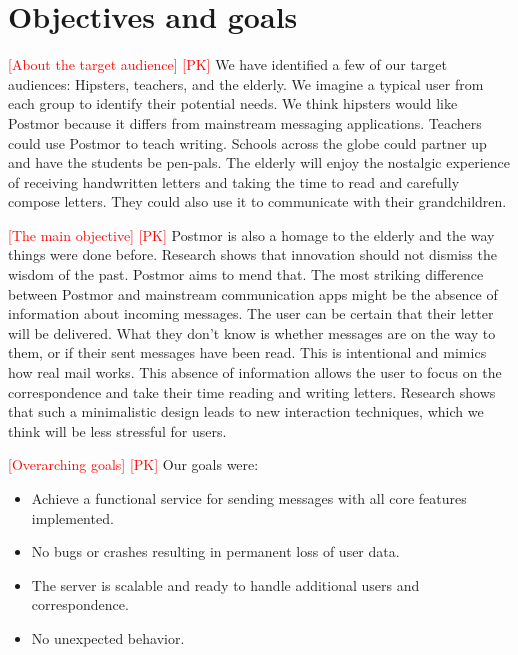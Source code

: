 \documentclass[acmlarge, review=false, screen=true]{acmart}
\begin{document}
  \section{Objectives and goals}
    \textcolor{red}{[About the target audience] [PK]} \newline
    We have identified a few of our target audiences: Hipsters, teachers, and the elderly. We imagine a typical user from each group to identify their potential needs. We think hipsters would like Postmor because it differs from mainstream messaging applications. Teachers could use Postmor to teach writing. Schools across the globe could partner up and have the students be pen-pals. The elderly will enjoy the nostalgic experience of receiving handwritten letters and taking the time to read and carefully compose letters. They could also use it to communicate with their grandchildren. 

    \textcolor{red}{[The main objective] [PK]} \newline
    Postmor is also a homage to the elderly and the way things were done before. Research shows that innovation should not dismiss the wisdom of the past\cite{design-inspiration}. Postmor aims to mend that. The most striking difference between Postmor and mainstream communication apps might be the absence of information about incoming messages. The user can be certain that their letter will be delivered. What they don’t know is whether messages are on the way to them, or if their sent messages have been read. This is intentional and mimics how real mail works. This absence of information allows the user to focus on the correspondence and take their time reading and writing letters. Research shows that such a minimalistic design leads to new interaction techniques\cite{simplicity-in-interactiondesign}, which we think will be less stressful for users.

    \textcolor{red}{[Overarching goals] [PK]} \newline
    Our goals were:
    \begin{itemize}
      \item Achieve a functional service for sending messages with all core features implemented.
      \item No bugs or crashes resulting in permanent loss of user data. 
      \item The server is scalable and ready to handle additional users and correspondence. 
      \item No unexpected behavior. 
    \end{itemize}
\end{document}

